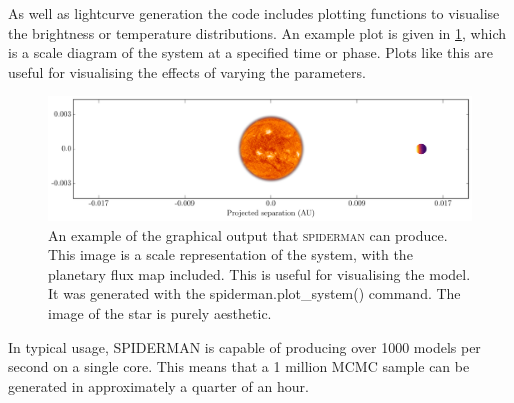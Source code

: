 \documentclass[a4paper,fleqn,usenatbib]{mnras}
\begin{document}







As well as lightcurve generation the code includes plotting functions to visualise the brightness or temperature distributions. An example plot is given in \ref{fig:plot_system}, which is a scale diagram of the system at a specified time or phase. Plots like this are useful for visualising the effects of varying the parameters.

\begin{figure}
\begin{center}
\includegraphics[width=\textwidth]{img/system.pdf}
\caption{An example of the graphical output that \textsc{spiderman} can produce. This image is a scale representation of the system, with the planetary flux map included. This is useful for visualising the model. It was generated with the spiderman.plot\_system() command. The image of the star is purely aesthetic.}
\label{fig:plot_system}
\end{center}
\end{figure}

In typical usage, SPIDERMAN is capable of producing over 1000 models per second on a single core. This means that a 1 million MCMC sample can be generated in approximately a quarter of an hour.
\end{document}

